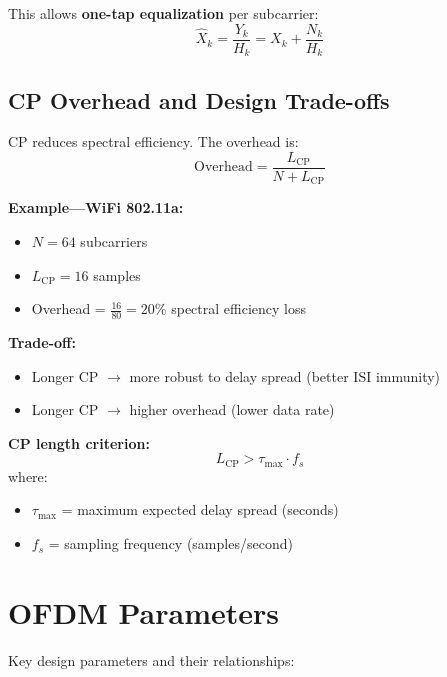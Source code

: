 This allows \textbf{one-tap equalization} per subcarrier:
\begin{equation}
\hat{X}_k = \frac{Y_k}{H_k} = X_k + \frac{N_k}{H_k}
\end{equation}

\subsection{CP Overhead and Design Trade-offs}

CP reduces spectral efficiency. The overhead is:
\begin{equation}
\mathrm{Overhead} = \frac{L_{\mathrm{CP}}}{N + L_{\mathrm{CP}}}
\end{equation}

\textbf{Example---WiFi 802.11a:}
\begin{itemize}
\item $N = 64$ subcarriers
\item $L_{\mathrm{CP}} = 16$ samples
\item Overhead = $\frac{16}{80} = 20\%$ spectral efficiency loss
\end{itemize}

\textbf{Trade-off:}
\begin{itemize}
\item[\checkmark] Longer CP $\rightarrow$ more robust to delay spread (better ISI immunity)
\item[\texttimes] Longer CP $\rightarrow$ higher overhead (lower data rate)
\end{itemize}

\textbf{CP length criterion:}
\begin{equation}
L_{\mathrm{CP}} > \tau_{\mathrm{max}} \cdot f_s
\end{equation}
where:
\begin{itemize}
\item $\tau_{\mathrm{max}}$ = maximum expected delay spread (seconds)
\item $f_s$ = sampling frequency (samples/second)
\end{itemize}

\section{OFDM Parameters}

Key design parameters and their relationships:

